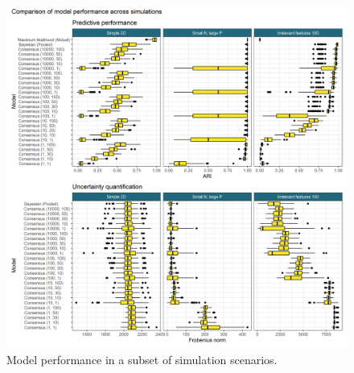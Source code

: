 \documentclass{bioinfo}
\begin{document}
\begin{figure} %
	\centering
	\includegraphics[scale=0.6]{./Images/Simulations/simulation_model_performance.png}
	\caption{Model performance in a subset of simulation scenarios. }
	\label{fig:simResults}
\end{figure}
\end{document}
